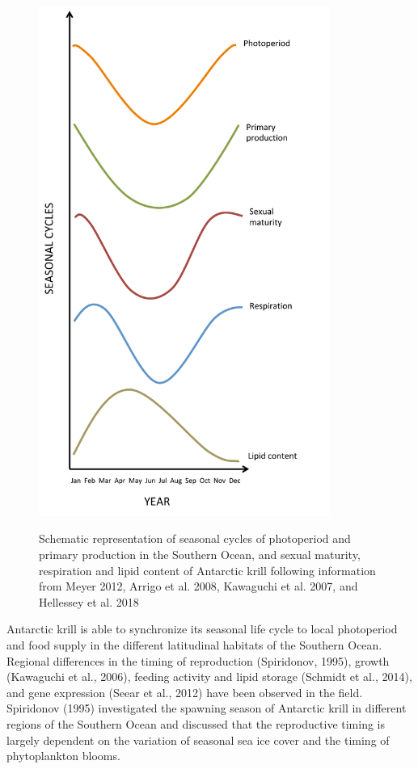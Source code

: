 \begin{figure}
        \caption{Schematic representation of seasonal cycles of photoperiod and
        primary production in the Southern Ocean, and sexual maturity,
        respiration and lipid content of Antarctic krill following information
        from Meyer 2012, Arrigo et al. 2008, Kawaguchi et al. 2007, and
        Hellessey et al. 2018}
        \centering
        \includegraphics[width=0.85\textwidth]{../Figures/Figure2.pdf}
        \label{figure2}
\end{figure}

Antarctic krill is able to synchronize its seasonal life cycle to local
photoperiod and food supply in the different latitudinal habitats of the
Southern Ocean. Regional differences in the timing of reproduction (Spiridonov,
1995), growth (Kawaguchi et al., 2006), feeding activity and lipid storage
(Schmidt et al., 2014), and gene expression (Seear et al., 2012) have been
observed in the field. Spiridonov (1995) investigated the spawning season of
Antarctic krill in different regions of the Southern Ocean and discussed that
the reproductive timing is largely dependent on the variation of  seasonal sea
ice cover and the timing of phytoplankton blooms. 


